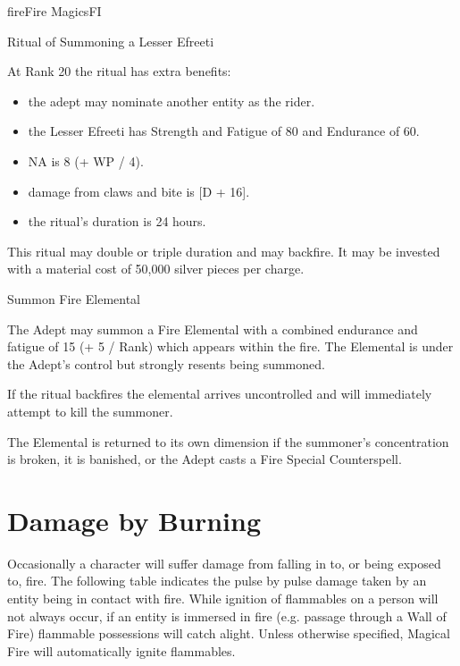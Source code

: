 \begin{College}[2.0]{fire}{Fire Magics}{FI}
\begin{ritual}[R-3]{Ritual of Summoning a Lesser Efreeti}
\begin{effects}
At Rank 20 the ritual has extra benefits:  

\begin{itemize}
\item the adept may nominate another entity as the rider.

\item the Lesser Efreeti has Strength and Fatigue of 80 and Endurance
  of 60.

\item NA is 8 (+ WP / 4).

\item damage from claws and bite is [D + 16].  

\item the ritual’s duration is 24 hours. 
\end{itemize}

This ritual may double or triple duration and may backfire. It may be
invested with a material cost of 50,000 silver pieces per charge.
\end{effects}
\end{ritual}

\begin{ritual}[R-4]{Summon Fire Elemental}

\begin{effects}
The Adept may summon a Fire Elemental with a combined endurance and
fatigue of 15 (+ 5 / Rank) which appears within the fire.  The
Elemental is under the Adept’s control but strongly resents being
summoned.

If the ritual backfires the elemental arrives uncontrolled and will
immediately attempt to kill the summoner.

The Elemental is returned to its own dimension if the summoner’s
concentration is broken, it is banished, or the Adept casts a Fire
Special Counterspell.
\end{effects}
\end{ritual}

\section{Damage by Burning}

Occasionally a character will suffer damage from falling in to, or
being exposed to, fire. The following table indicates the pulse by
pulse damage taken by an entity being in contact with fire. While
ignition of flammables on a person will not always occur, if an entity
is immersed in fire (e.g. passage through a Wall of Fire) flammable
possessions will catch alight.  Unless otherwise specified, Magical
Fire will automatically ignite flammables.


\end{College}
